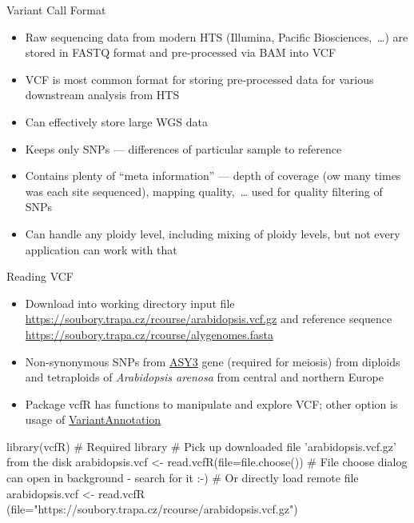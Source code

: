 \documentclass[compress, ucs, xelatex, 11pt, xcolor=svgnames, aspectratio=169,
	hyperref={
		bookmarks=true,
		unicode=true,
		colorlinks=true,
		pdftitle={Molecular data in R},
		plainpages=false,
		pdfauthor={Vojtech Zeisek},
		pdfsubject={Course about phylogeny and evolution in R},
		pdfcreator={XeLaTeX},
		pdfkeywords={R, evolution, phylogeny, molecular data},
		linkcolor=Crimson, %
		anchorcolor=Magenta, %
		citecolor=Magenta, %
		filecolor=Magenta, %
		menucolor=Magenta, %
		urlcolor=DodgerBlue, %
		pdftex},
	url={hyphens, lowtilde} %
	]{beamer}
\begin{document}
\begin{frame}{Variant Call Format}
	\begin{itemize}
		\item Raw sequencing data from modern HTS (Illumina, Pacific Biosciences,~\ldots) are stored in FASTQ format and pre-processed via BAM into VCF
		\item VCF is most common format for storing pre-processed data for various downstream analysis from HTS
		\item Can effectively store large WGS data
		\item Keeps only SNPs --- differences of particular sample to reference
		\item Contains plenty of \enquote{meta information} --- depth of coverage (ow many times was each site sequenced), mapping quality,~\ldots{ }used for quality filtering of SNPs
		\item Can handle any ploidy level, including mixing of ploidy levels, but not every application can work with that
	\end{itemize}
\end{frame}

\begin{frame}[fragile]{Reading VCF}
	\begin{itemize}
		\item Download into working directory input file \url{https://soubory.trapa.cz/rcourse/arabidopsis.vcf.gz} and reference sequence \url{https://soubory.trapa.cz/rcourse/alygenomes.fasta}
		\item Non-synonymous SNPs from \href{https://www.arabidopsis.org/servlets/TairObject?type=locus&name=At2g46980}{ASY3} gene (required for meiosis) from diploids and tetraploids of \textit{Arabidopsis arenosa} from central and northern Europe
		\item Package vcfR has functions to manipulate and explore VCF; other option is usage of \href{https://bioconductor.org/packages/release/bioc/html/VariantAnnotation.html}{VariantAnnotation}
	\end{itemize}
	\begin{spluscode}
    library(vcfR) # Required library
    # Pick up downloaded file 'arabidopsis.vcf.gz' from the disk
    arabidopsis.vcf <- read.vcfR(file=file.choose())
    # File choose dialog can open in background - search for it :-)
    # Or directly load remote file
    arabidopsis.vcf <- read.vcfR
      (file="https://soubory.trapa.cz/rcourse/arabidopsis.vcf.gz")
	\end{spluscode}
\end{frame}
\end{document}
